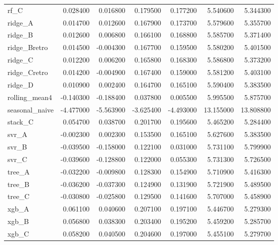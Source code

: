 \begin{tabular}{lrrrrrr}
rf_C & 0.028400 & 0.016800 & 0.179500 & 0.177200 & 5.540600 & 5.344300 \\
ridge_A & 0.014700 & 0.012600 & 0.167900 & 0.173700 & 5.579600 & 5.355700 \\
ridge_B & 0.012600 & 0.006800 & 0.166100 & 0.168800 & 5.585700 & 5.371400 \\
ridge_Bretro & 0.014500 & -0.004300 & 0.167700 & 0.159500 & 5.580200 & 5.401500 \\
ridge_C & 0.012200 & 0.006200 & 0.165800 & 0.168300 & 5.586800 & 5.373200 \\
ridge_Cretro & 0.014200 & -0.004900 & 0.167400 & 0.159000 & 5.581200 & 5.403100 \\
ridge_D & 0.010900 & 0.002400 & 0.164700 & 0.165100 & 5.590400 & 5.383500 \\
rolling_mean4 & -0.140300 & -0.188400 & 0.037800 & 0.005500 & 5.995500 & 5.875700 \\
seasonal_naive & -4.477000 & -5.563900 & -3.625400 & -4.493000 & 13.155000 & 13.808800 \\
stack_C & 0.054700 & 0.038700 & 0.201700 & 0.195600 & 5.465200 & 5.284400 \\
svr_A & -0.002300 & 0.002300 & 0.153500 & 0.165100 & 5.627600 & 5.383500 \\
svr_B & -0.039500 & -0.158000 & 0.122100 & 0.031000 & 5.731100 & 5.799900 \\
svr_C & -0.039600 & -0.128800 & 0.122000 & 0.055300 & 5.731300 & 5.726500 \\
tree_A & -0.032200 & -0.009800 & 0.128300 & 0.154900 & 5.710900 & 5.416300 \\
tree_B & -0.036200 & -0.037300 & 0.124900 & 0.131900 & 5.721900 & 5.489500 \\
tree_C & -0.030800 & -0.025800 & 0.129500 & 0.141600 & 5.707000 & 5.458900 \\
xgb_A & 0.061100 & 0.040600 & 0.207100 & 0.197100 & 5.446700 & 5.279300 \\
xgb_B & 0.056800 & 0.038300 & 0.203400 & 0.195200 & 5.459200 & 5.285700 \\
xgb_C & 0.058200 & 0.040500 & 0.204600 & 0.197000 & 5.455100 & 5.279700 \\
\bottomrule
\end{tabular}

